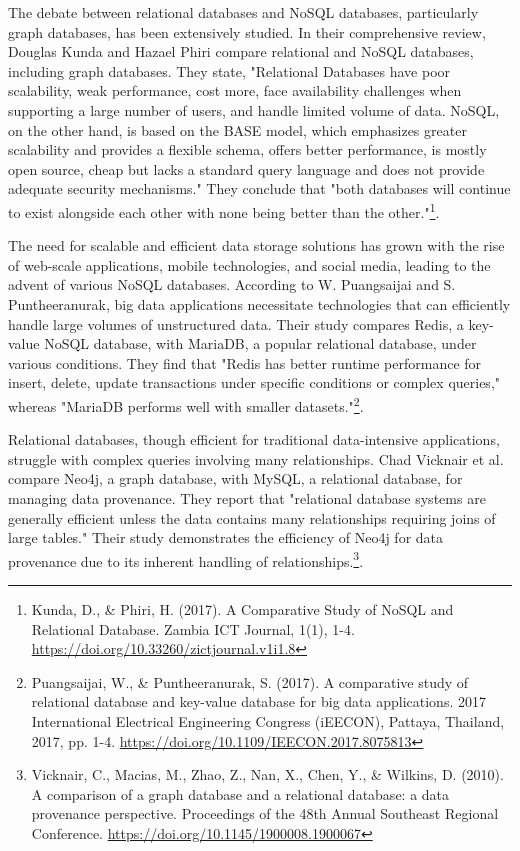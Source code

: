 
The debate between relational databases and NoSQL databases, particularly graph databases, has been extensively studied. In their comprehensive review, Douglas Kunda and Hazael Phiri compare relational and NoSQL databases, including graph databases. They state, "Relational Databases have poor scalability, weak performance, cost more, face availability challenges when supporting a large number of users, and handle limited volume of data. NoSQL, on the other hand, is based on the BASE model, which emphasizes greater scalability and provides a flexible schema, offers better performance, is mostly open source, cheap but lacks a standard query language and does not provide adequate security mechanisms." They conclude that "both databases will continue to exist alongside each other with none being better than the other."\footnote{Kunda, D., \& Phiri, H. (2017). A Comparative Study of NoSQL and Relational Database. Zambia ICT Journal, 1(1), 1-4. \url{https://doi.org/10.33260/zictjournal.v1i1.8}}.

The need for scalable and efficient data storage solutions has grown with the rise of web-scale applications, mobile technologies, and social media, leading to the advent of various NoSQL databases. According to W. Puangsaijai and S. Puntheeranurak, big data applications necessitate technologies that can efficiently handle large volumes of unstructured data. Their study compares Redis, a key-value NoSQL database, with MariaDB, a popular relational database, under various conditions. They find that "Redis has better runtime performance for insert, delete, update transactions under specific conditions or complex queries," whereas "MariaDB performs well with smaller datasets."\footnote{Puangsaijai, W., \& Puntheeranurak, S. (2017). A comparative study of relational database and key-value database for big data applications. 2017 International Electrical Engineering Congress (iEECON), Pattaya, Thailand, 2017, pp. 1-4. \url{https://doi.org/10.1109/IEECON.2017.8075813}}.

Relational databases, though efficient for traditional data-intensive applications, struggle with complex queries involving many relationships. Chad Vicknair et al. compare Neo4j, a graph database, with MySQL, a relational database, for managing data provenance. They report that "relational database systems are generally efficient unless the data contains many relationships requiring joins of large tables." Their study demonstrates the efficiency of Neo4j for data provenance due to its inherent handling of relationships.\footnote{Vicknair, C., Macias, M., Zhao, Z., Nan, X., Chen, Y., \& Wilkins, D. (2010). A comparison of a graph database and a relational database: a data provenance perspective. Proceedings of the 48th Annual Southeast Regional Conference. \url{https://doi.org/10.1145/1900008.1900067}}.


